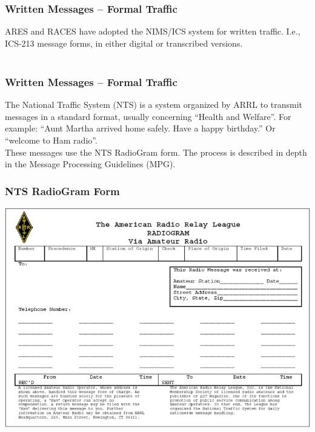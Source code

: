 \documentclass[10pt]{beamer}
\begin{document}
\begin{frame}
\frametitle{Written Messages – Formal Traffic}
ARES and RACES have adopted the NIMS/ICS system for written traffic. I.e., ICS-213 message forms, in either digital or transcribed versions.\\ \hfil \\
 
\end{frame}

\begin{frame}
\frametitle{Written Messages – Formal Traffic}
The National Traffic System (NTS) is a system organized by ARRL to transmit messages in a standard format, usually concerning “Health and Welfare”. For example: “Aunt Martha arrived home safely. Have a happy birthday.”  Or “welcome to Ham radio”. \\

These messages use the NTS RadioGram form. The process is described in depth in the Message Processing Guidelines (MPG).
\end{frame}

\begin{frame}
\frametitle{NTS RadioGram Form}
\centering \includegraphics[width=\textwidth]{radiogramform.png}
\end{frame}
\end{document}
